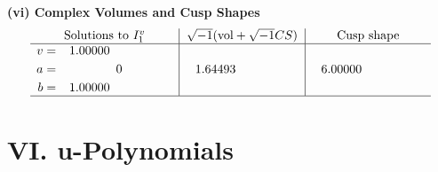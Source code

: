 \documentclass[1p]{elsarticle_modified}
\theoremstyle{definition}
\newcommand{\I}{\sqrt{-1}}
\begin{document}
\newpage\flushleft \textbf{(vi) Complex Volumes and Cusp Shapes}
$$\begin{array}{c|c|c}  
\text{Solutions to }I^v_{1}& \I (\text{vol} + \sqrt{-1}CS) & \text{Cusp shape}\\
 \hline 
\begin{aligned}
v &= \phantom{-}1.00000\phantom{ +0.000000I} \\
a &= \phantom{-0.000000 } 0 \\
b &= \phantom{-}1.00000\phantom{ +0.000000I}\end{aligned}
 & \phantom{-}1.64493\phantom{ +0.000000I} & \phantom{-}6.00000\phantom{ +0.000000I}\\
 \hline 
 \end{array}$$\newpage
\newpage\renewcommand{\arraystretch}{1}
\centering \section*{ VI. u-Polynomials}
\end{document}
